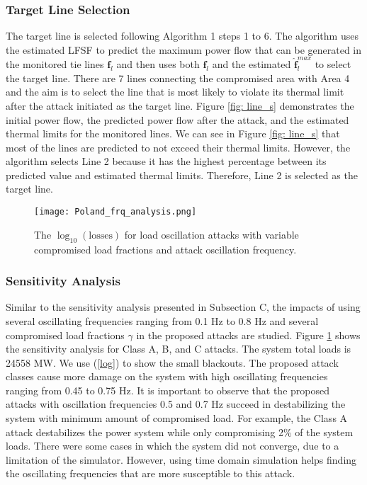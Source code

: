 \documentclass[journal]{IEEEtran}
\begin{document}
\subsubsection{Target Line Selection} The target line is selected following Algorithm 1 steps 1 to 6. The algorithm uses the estimated LFSF to predict the maximum power flow that can be generated in the monitored tie lines $ \mathbf{f}_l$ and then uses both $ \mathbf{f}_l$ and the estimated $\mathbf{\hat{f}}_{l}^{max}$ to select the target line. 
There are 7 lines connecting the compromised area with Area 4 and the aim is to select the line that is most likely to violate its thermal limit after the attack initiated as the target line. 
Figure \ref{fig: line_s} demonstrates the initial power flow, the predicted power flow after the attack, and the estimated thermal limits for the monitored lines. We can see in Figure \ref{fig: line_s} that most of the lines are predicted to not exceed their thermal limits. However, the algorithm selects Line 2 because it has the highest percentage  between its predicted value and estimated thermal limits. Therefore, Line 2 is selected as the target line. 




\begin{figure}[t]
\centering
\texttt{[image: Poland\_frq\_analysis.png]}
\caption{The $\log_{10} (\text{losses})$  for load oscillation attacks with variable compromised load fractions and attack oscillation frequency.}
\label{fig: poland_freq}
\end{figure} 





\subsubsection{Sensitivity Analysis} Similar to the sensitivity analysis presented in Subsection C, the impacts of using several oscillating frequencies ranging from 0.1 Hz to 0.8 Hz and several compromised load fractions $\gamma$ in the proposed attacks are studied. Figure \ref{fig: poland_freq} shows the sensitivity analysis for Class A, B, and C attacks. The system total loads is 24558 MW. We use (\ref{log}) to show the small blackouts. The proposed attack classes cause more damage on the system with high oscillating frequencies ranging from 0.45 to 0.75 Hz. It is important to observe that the proposed attacks with oscillation frequencies 0.5 and 0.7 Hz succeed in destabilizing the system with minimum amount of compromised load. For example, the Class A attack destabilizes the power system while only compromising 2\% of the system loads. %
There were some cases in which the system did not converge, due to a limitation of the simulator.  However, using time domain simulation helps finding the oscillating frequencies that are more susceptible to this attack.   
\end{document}

